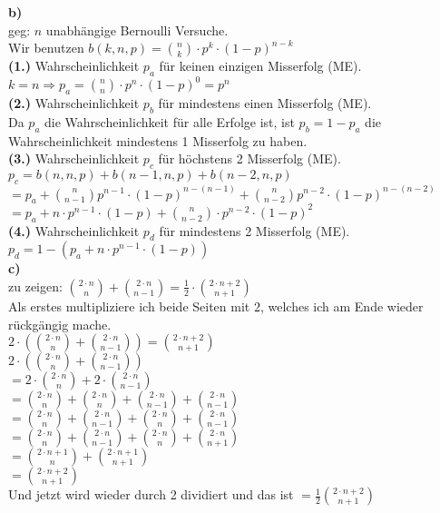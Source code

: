 \documentclass[a4paper]{scrartcl}
\begin{document}
\begin{flushleft}
		\textbf{b)}\\
		geg: $n$ unabhängige Bernoulli Versuche.\\
		Wir benutzen $b(k,n,p)=\binom{n}{k}\cdot p^k\cdot (1-p)^{n-k}$\\[1em]
		\textbf{(1.)} Wahrscheinlichkeit $p_a$ für keinen einzigen Misserfolg (ME).\\[1em]
		$k=n \Rightarrow p_a=\binom{n}{n}\cdot p^n\cdot (1-p)^0=p^n$\\[1em]
		\textbf{(2.)} Wahrscheinlichkeit $p_b$ für mindestens einen Misserfolg (ME).\\[1em]
		Da $p_a$ die Wahrscheinlichkeit für alle Erfolge ist, ist $p_b=1-p_a$ die Wahrscheinlichkeit mindestens 1 Misserfolg zu haben.\\[1em]		
		\textbf{(3.)} Wahrscheinlichkeit $p_c$ für höchstens 2 Misserfolg (ME).\\[1em]
		$p_c=b(n,n,p)+b(n-1,n,p)+b(n-2,n,p)$\\
		$= p_a+\binom{n}{n-1}p^{n-1}\cdot (1-p)^{n-(n-1)}+\binom{n}{n-2}p^{n-2}\cdot (1-p)^{n-(n-2)}$\\
		$=p_a+n\cdot p^{n-1}\cdot (1-p)+\binom{n}{n-2}\cdot p^{n-2}\cdot (1-p)^2$\\
		\textbf{(4.)} Wahrscheinlichkeit $p_d$ für mindestens 2 Misserfolg (ME).\\[1em]
		$p_d=1-(p_a+n\cdot p^{n-1}\cdot (1-p))$\\[1em]

		\textbf{c)}\\
		zu zeigen: $\binom{2\cdot n}{n} + \binom{2\cdot n}{n - 1} = \frac{1}{2}\cdot\binom{2\cdot n + 2}{n + 1}$\\[1em]
		Als erstes multipliziere ich beide Seiten mit $2$, welches ich am Ende wieder rückgängig mache.\\
		$2\cdot(\binom{2\cdot n}{n} + \binom{2\cdot n}{n - 1}) = \binom{2\cdot n + 2}{n + 1}$\\[1em]
		$2\cdot(\binom{2\cdot n}{n} + \binom{2\cdot n}{n - 1})$\\
		$= 2\cdot\binom{2\cdot n}{n} + 2\cdot\binom{2\cdot n}{n - 1}$\\
		$= \binom{2\cdot n}{n} + \binom{2\cdot n}{n} + \binom{2\cdot n}{n - 1} + \binom{2\cdot n}{n - 1}$\\
		$= \binom{2\cdot n}{n} + \binom{2\cdot n}{n - 1} + \binom{2\cdot n}{n} + \binom{2\cdot n}{n - 1}$\\
		$= \binom{2\cdot n}{n} + \binom{2\cdot n}{n - 1} + \binom{2\cdot n}{n} + \binom{2\cdot n}{n + 1}$\\
		$= \binom{2\cdot n + 1}{n} + \binom{2\cdot n + 1}{n + 1}$\\
		$= \binom{2\cdot n + 2}{n + 1}$\\[1em]
		Und jetzt wird wieder durch 2 dividiert und das ist $= \frac{1}{2}\binom{2\cdot n + 2}{n + 1}$\\[1em]


\end{flushleft}
\end{document}
